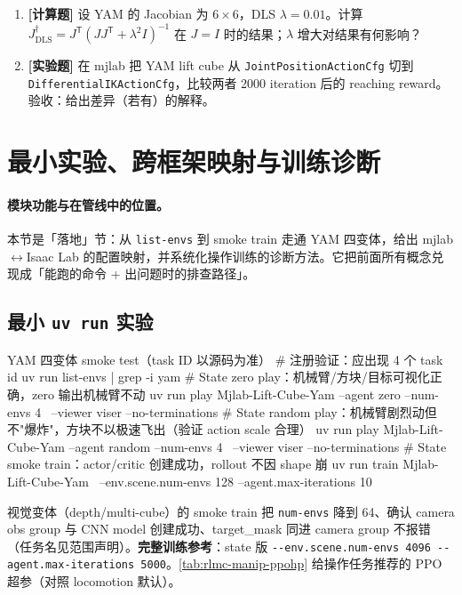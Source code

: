 \begin{practice}[本节练习]
\begin{enumerate}
  \item \textbf{[计算题]} 设 YAM 的 Jacobian 为 $6\times6$，DLS $\lambda=0.01$。计算 $J^\dagger_{\text{DLS}}=J^{\mathsf T}(JJ^{\mathsf T}+\lambda^2 I)^{-1}$ 在 $J=I$ 时的结果；$\lambda$ 增大对结果有何影响？
  \item \textbf{[实验题]} 在 mjlab 把 YAM lift cube 从 \verb|JointPositionActionCfg| 切到 \verb|DifferentialIKActionCfg|，比较两者 2000 iteration 后的 reaching reward。验收：给出差异（若有）的解释。
\end{enumerate}
\end{practice}

\section{最小实验、跨框架映射与训练诊断}
\label{sec:rlmc-manip-run}

\paragraph{模块功能与在管线中的位置。}本节是「落地」节：从 \verb|list-envs| 到 smoke train 走通 YAM 四变体，给出 mjlab$\leftrightarrow$Isaac Lab 的配置映射，并系统化操作训练的诊断方法。它把前面所有概念兑现成「能跑的命令 + 出问题时的排查路径」。

\subsection{最小 \texttt{uv run} 实验}
\label{sec:rlmc-manip-smoke}

\begin{codebox}[bash]{YAM 四变体 smoke test（task ID 以源码为准）}
# 注册验证：应出现 4 个 task id
uv run list-envs | grep -i yam
# State zero play：机械臂/方块/目标可视化正确，zero 输出机械臂不动
uv run play Mjlab-Lift-Cube-Yam --agent zero --num-envs 4 \
    --viewer viser --no-terminations
# State random play：机械臂剧烈动但不"爆炸"，方块不以极速飞出（验证 action scale 合理）
uv run play Mjlab-Lift-Cube-Yam --agent random --num-envs 4 \
    --viewer viser --no-terminations
# State smoke train：actor/critic 创建成功，rollout 不因 shape 崩
uv run train Mjlab-Lift-Cube-Yam \
    --env.scene.num-envs 128 --agent.max-iterations 10
\end{codebox}

视觉变体（depth/multi-cube）的 smoke train 把 \verb|num-envs| 降到 64、确认 camera obs group 与 CNN model 创建成功、target\_mask 同进 camera group 不报错（任务名见范围声明）。\textbf{完整训练参考}：state 版 \verb|--env.scene.num-envs 4096 --agent.max-iterations 5000|。\cref{tab:rlmc-manip-ppohp} 给操作任务推荐的 PPO 超参（对照 locomotion 默认）。

